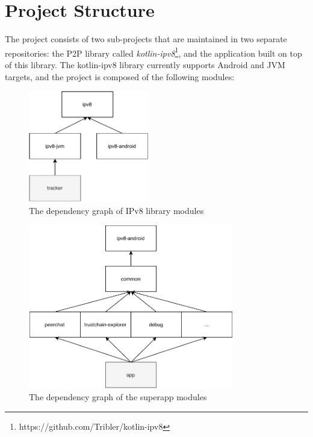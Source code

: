 \section{Project Structure}

The project consists of two sub-projects that are maintained in two separate repositories: the P2P library called \textit{kotlin-ipv8}\footnote{https://github.com/Tribler/kotlin-ipv8}, and the application built on top of this library. The kotlin-ipv8 library currently supports Android and JVM targets, and the project is composed of the following modules:

\begin{figure}
    \centering
    \includegraphics[width=0.47\textwidth]{diagrams/ipv8-modules}
    \caption{The dependency graph of IPv8 library modules}
    \label{manyverse}
\end{figure}

\begin{figure}
    \centering
    \includegraphics[width=0.8\textwidth]{diagrams/superapp-modules}
    \caption{The dependency graph of the superapp modules}
    \label{manyverse}
\end{figure}


